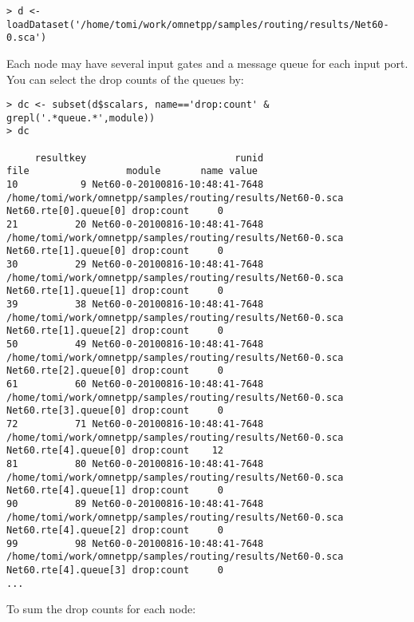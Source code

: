 \begin{verbatim}
> d <- loadDataset('/home/tomi/work/omnetpp/samples/routing/results/Net60-0.sca')
\end{verbatim}

Each node may have several input gates and a message queue for each input port.
You can select the drop counts of the queues by:

\begin{verbatim}
> dc <- subset(d$scalars, name=='drop:count' & grepl('.*queue.*',module))
> dc

     resultkey                          runid                                                        file                 module       name value
10           9 Net60-0-20100816-10:48:41-7648 /home/tomi/work/omnetpp/samples/routing/results/Net60-0.sca  Net60.rte[0].queue[0] drop:count     0
21          20 Net60-0-20100816-10:48:41-7648 /home/tomi/work/omnetpp/samples/routing/results/Net60-0.sca  Net60.rte[1].queue[0] drop:count     0
30          29 Net60-0-20100816-10:48:41-7648 /home/tomi/work/omnetpp/samples/routing/results/Net60-0.sca  Net60.rte[1].queue[1] drop:count     0
39          38 Net60-0-20100816-10:48:41-7648 /home/tomi/work/omnetpp/samples/routing/results/Net60-0.sca  Net60.rte[1].queue[2] drop:count     0
50          49 Net60-0-20100816-10:48:41-7648 /home/tomi/work/omnetpp/samples/routing/results/Net60-0.sca  Net60.rte[2].queue[0] drop:count     0
61          60 Net60-0-20100816-10:48:41-7648 /home/tomi/work/omnetpp/samples/routing/results/Net60-0.sca  Net60.rte[3].queue[0] drop:count     0
72          71 Net60-0-20100816-10:48:41-7648 /home/tomi/work/omnetpp/samples/routing/results/Net60-0.sca  Net60.rte[4].queue[0] drop:count    12
81          80 Net60-0-20100816-10:48:41-7648 /home/tomi/work/omnetpp/samples/routing/results/Net60-0.sca  Net60.rte[4].queue[1] drop:count     0
90          89 Net60-0-20100816-10:48:41-7648 /home/tomi/work/omnetpp/samples/routing/results/Net60-0.sca  Net60.rte[4].queue[2] drop:count     0
99          98 Net60-0-20100816-10:48:41-7648 /home/tomi/work/omnetpp/samples/routing/results/Net60-0.sca  Net60.rte[4].queue[3] drop:count     0
...
\end{verbatim}

To sum the drop counts for each node:

